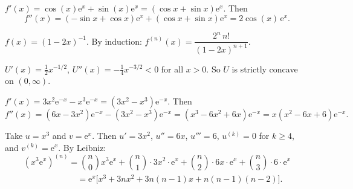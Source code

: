 \begin{solutions}
  \item $f'(x)=\cos(x)\mathrm{e}^{x}+\sin(x)\mathrm{e}^{x}
        =(\cos x+\sin x)\mathrm{e}^{x}$. Then
        \[
          f''(x)=(-\sin x+\cos x)\mathrm{e}^{x}
                 +(\cos x+\sin x)\mathrm{e}^{x}
                =2\cos(x)\,\mathrm{e}^{x} .
        \]

  \item $f(x)=(1-2x)^{-1}$. By induction:
        $f^{(n)}(x)=\dfrac{2^{n}\,n!}{(1-2x)^{n+1}}$.

  \item $U'(x)=\tfrac12 x^{-1/2}$, $U''(x)=-\tfrac14 x^{-3/2}<0$ for all
        $x>0$. So $U$ is strictly concave on $(0,\infty)$.

  \item $f'(x)=3x^{2}\mathrm{e}^{-x}-x^{3}\mathrm{e}^{-x}
        =(3x^{2}-x^{3})\mathrm{e}^{-x}$. Then
        \[
          f''(x)=(6x-3x^{2})\mathrm{e}^{-x}-(3x^{2}-x^{3})\mathrm{e}^{-x}
                =(x^{3}-6x^{2}+6x)\mathrm{e}^{-x}
                =x(x^{2}-6x+6)\mathrm{e}^{-x} .
        \]

  \item Take $u=x^{3}$ and $v=\mathrm{e}^{x}$. Then $u'=3x^{2}$,
        $u''=6x$, $u'''=6$, $u^{(k)}=0$ for $k\geq 4$, and
        $v^{(k)}=\mathrm{e}^{x}$. By Leibniz:
        \[
          (x^{3}\mathrm{e}^{x})^{(n)}
            =\binom{n}{0}x^{3}\mathrm{e}^{x}
             +\binom{n}{1}\cdot 3x^{2}\cdot\mathrm{e}^{x}
             +\binom{n}{2}\cdot 6x\cdot\mathrm{e}^{x}
             +\binom{n}{3}\cdot 6\cdot\mathrm{e}^{x}
        \]
        \[
          \phantom{(x^{3}\mathrm{e}^{x})^{(n)}}
            =\mathrm{e}^{x}\bigl[x^{3}+3nx^{2}+3n(n-1)x+n(n-1)(n-2)\bigr] .
        \]
\end{solutions}
